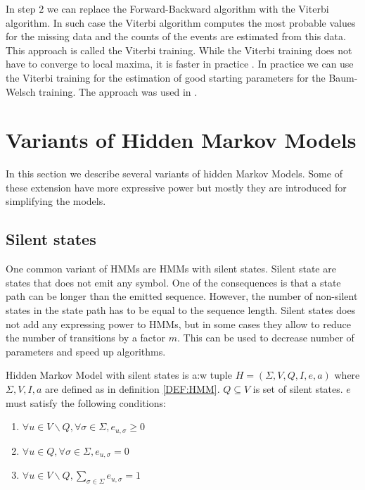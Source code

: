 In step $2$ we can replace the Forward-Backward algorithm with the Viterbi
algorithm. In such case the Viterbi algorithm computes the most probable values
for the missing data and the counts of the events are estimated from this data.
This approach is called the Viterbi training.  While the Viterbi training does
not have to converge to local maxima, it is faster in practice
\cite{Durbin1998}.  In practice we can use the Viterbi training for the
estimation of good starting parameters for the Baum-Welsch training. The
approach was used in \cite{FEAST2011}.

\section{Variants of Hidden Markov Models}

In this section we describe several variants of hidden Markov Models.
Some of these extension have more expressive power but mostly they are
introduced for simplifying the models.

\subsection{Silent states}

One common variant of HMMs are HMMs with silent states. Silent state are states
that does not emit any symbol. One of the consequences is  that a state path can
be longer than the emitted sequence. However, the number of non-silent states in
the state path has to be equal to the sequence length. Silent states does not
add any expressing power to HMMs, but in some cases they allow to reduce the
number of transitions by a factor $m$. This can be used to decrease number of
parameters and speed up algorithms. 

\begin{definition}
Hidden Markov Model with silent states is a:w
tuple $H=(\Sigma,V,Q,I,e,a)$
where $\Sigma,V,I,a$ are defined as in definition \ref{DEF:HMM}. $Q\subseteq V$ is set of
silent states. $e$ must satisfy the following conditions:
\begin{enumerate}
\item $\forall u\in V\backslash Q,\forall \sigma\in\Sigma, e_{u,\sigma}\geq0$
\item $\forall u\in Q,\forall \sigma\in\Sigma, e_{u,\sigma}=0$
\item $\forall u\in V\backslash Q, \sum_{\sigma\in \Sigma}e_{u,\sigma}=1$
\end{enumerate}
\end{definition}

